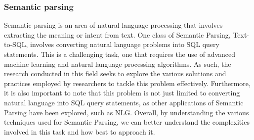 \subsubsection{Semantic parsing}

Semantic parsing\cite{krishnamurthy-etal-2017-neural} is an area of natural language processing that involves extracting the meaning or intent from text. One class of Semantic Parsing, Text-to-SQL, involves converting natural language problems into SQL query statements. This is a challenging task, one that requires the use of advanced machine learning and natural language processing algorithms. As such, the research conducted in this field seeks to explore the various solutions and practices employed by researchers to tackle this problem effectively. Furthermore, it is also important to note that this problem is not just limited to converting natural language into SQL query statements, as other applications of Semantic Parsing have been explored, such as \ac{NLG}. Overall, by understanding the various techniques used for Semantic Parsing, we can better understand the complexities involved in this task and how best to approach it.

